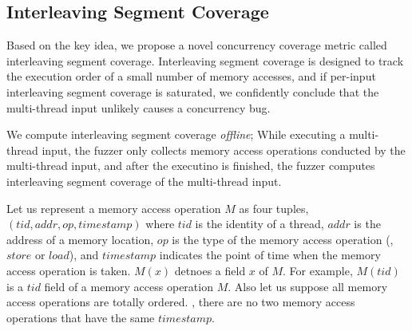 \subsection{Interleaving Segment Coverage}
\label{ss:coverage}

\newcommand{\mutable}{mutable edge\xspace}
\newcommand{\mutables}{mutable edges\xspace}
\newcommand{\immutable}{immutable edge\xspace}
\newcommand{\immutables}{immutable edges\xspace}


Based on the key idea, we propose a novel concurrency coverage metric
called interleaving segment coverage.
%
Interleaving segment coverage is designed to track the execution order
of a small number of memory accesses, and if per-input interleaving
segment coverage is saturated, we confidently conclude that the
multi-thread input unlikely causes a concurrency bug.


We compute interleaving segment coverage \textit{offline}; While
executing a multi-thread input, the fuzzer only collects memory access
operations conducted by the multi-thread input, and after the
executino is finished, the fuzzer computes interleaving segment
coverage of the multi-thread input.



%
Let us represent a memory access operation $M$ as four tuples,
$(tid, addr, op, timestamp)$ where $tid$ is the identity of a thread,
$addr$ is the address of a memory location, $op$ is the type of the
memory access operation (\ie, $store$ or $load$), and $timestamp$
indicates the point of time when the memory access operation is taken.
%
$M(x)$ detnoes a field $x$ of $M$. For example, $M(tid)$ is a $tid$
field of a memory access operation $M$.
%
Also let us suppose all memory access operations are totally
ordered. \ie, there are no two memory access operations that have the
same $timestamp$.




